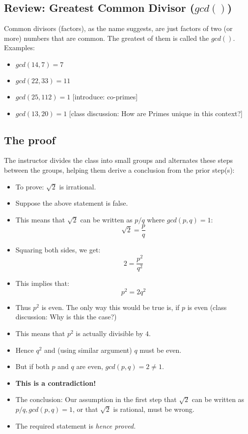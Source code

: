 \documentclass{article}
\begin{document}
\subsection*{Review: Greatest Common Divisor ($gcd()$)}
Common divisors (factors), as the name suggests, 
are just factors of two (or more) numbers that are common. 
The greatest of them is called the $gcd()$. Examples:
\begin{itemize}
  \item $gcd(14,7)=7$
  \item $gcd(22,33)=11$
  \item $gcd(25,112)=1$ [introduce: co-primes]
  \item $gcd(13,20)=1$ [class discussion: How are Primes unique in this context?]
\end{itemize}

\subsection*{The proof}
The instructor divides the class into small groups
and alternates these steps between the groups, helping 
them derive a conclusion from the prior step(s):
\begin{itemize}
  \item To prove: $\sqrt{2}$ is irrational.
  \item Suppose the above statement is false.
  \item This means that $\sqrt{2}$ can be written as $p/q$ 
    where $gcd(p,q)=1$:
    $$\sqrt{2} = \frac{p}{q}$$
  \item Squaring both sides, we get:
    $$2 = \frac{p^2}{q^2}$$
  \item This implies that:
    $$p^2=2q^2$$
  \item Thus $p^2$ is even. The only way this would be true
    is, if $p$ is even (class discussion: Why is this the case?)
  \item This means that $p^2$ is actually divisible by $4$.
  \item Hence $q^2$ and (using similar argument) $q$ must be even.
  \item But if both $p$ and $q$ are even, $gcd(p,q)=2\ne{1}$.
  \item \textbf{This is a contradiction!}
  \item The conclusion: Our assumption in the first step that 
    $\sqrt{2}$ can be written as $p/q, gcd(p,q)=1$, or that
    $\sqrt{2}$ is rational, must be wrong.
  \item The required statement is \textit{hence proved.}
\end{itemize}
\end{document}
